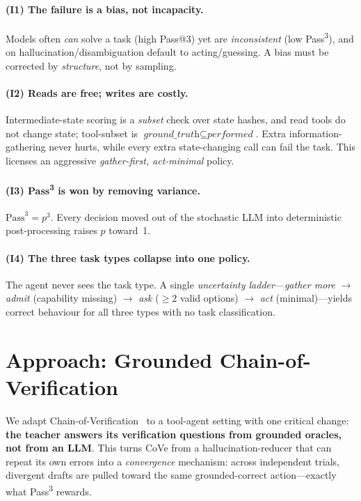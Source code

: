 \documentclass{article}
\begin{document}
\paragraph{(I1) The failure is a bias, not incapacity.} Models often \emph{can} solve
a task (high Pass@3) yet are \emph{inconsistent} (low Pass\textsuperscript{3}), and on
hallucination/disambiguation default to acting/guessing. A bias must be corrected by
\emph{structure}, not by sampling.

\paragraph{(I2) Reads are free; writes are costly.} Intermediate-state scoring is a
\emph{subset} check over state hashes, and read tools do not change state;
tool-subset is $\textit{ground\_truth} \subseteq \textit{performed}$. Extra
information-gathering never hurts, while every extra state-changing call can fail the
task. This licenses an aggressive \emph{gather-first, act-minimal} policy.

\paragraph{(I3) Pass\textsuperscript{3} is won by removing variance.}
$\textrm{Pass}^3 = p^3$. Every decision moved out of the stochastic LLM into
deterministic post-processing raises $p$ toward~1.

\paragraph{(I4) The three task types collapse into one policy.} The agent never sees
the task type. A single \emph{uncertainty ladder}---\emph{gather more} $\rightarrow$
\emph{admit} (capability missing) $\rightarrow$ \emph{ask} ($\geq 2$ valid options)
$\rightarrow$ \emph{act} (minimal)---yields correct behaviour for all three types with
no task classification.

\section{Approach: Grounded Chain-of-Verification}
We adapt Chain-of-Verification~\cite{dhuliawala2023cove} to a tool-agent setting with
one critical change: \textbf{the teacher answers its verification questions from
grounded oracles, not from an LLM}. This turns CoVe from a hallucination-reducer that
can repeat its own errors into a \emph{convergence} mechanism: across independent
trials, divergent drafts are pulled toward the same grounded-correct action---exactly
what Pass\textsuperscript{3} rewards.
\end{document}
